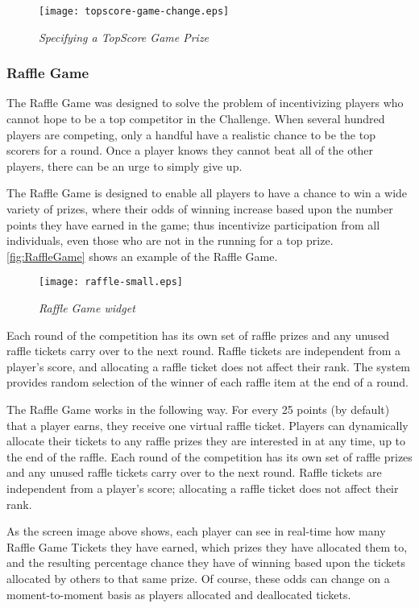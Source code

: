 \begin{figure}[!ht]
  \center
  \texttt{[image: topscore-game-change.eps]}
  \caption{\em Specifying a TopScore Game Prize}
  \label{fig:topscore-game-change}
\end{figure}

\clearpage

\subsubsection{Raffle Game}

The Raffle Game was designed to solve the problem of incentivizing players who cannot hope to be a top competitor in the Challenge. When several hundred players are competing, only a handful have a realistic chance to be the top scorers for a round. Once a player knows they cannot beat all of the other players, there can be an urge to simply give up.

The Raffle Game is designed to enable all players to have a chance to win a wide variety of prizes, where their odds of winning increase based upon the number points they have earned in the game; thus incentivize participation from all individuals, even those who are not in the running for a top prize. \autoref{fig:RaffleGame} shows an example of the Raffle Game.

\begin{figure}[!ht]
  \center
  \texttt{[image: raffle-small.eps]}
  \caption{\em Raffle Game widget}
  \label{fig:RaffleGame}
\end{figure}

Each round of the competition has its own set of raffle prizes and any unused raffle tickets carry over to the next round. Raffle tickets are independent from a player's score, and allocating a raffle ticket does not affect their rank. The system provides random selection of the winner of each raffle item at the end of a round.

The Raffle Game works in the following way. For every 25 points (by default) that a player earns, they receive one virtual raffle ticket. Players can dynamically allocate their tickets to any raffle prizes they are interested in at any time, up to the end of the raffle. Each round of the competition has its own set of raffle prizes and any unused raffle tickets carry over to the next round. Raffle tickets are independent from a player's score; allocating a raffle ticket does not affect their rank.

As the screen image above shows, each player can see in real-time how many Raffle Game Tickets they have earned, which prizes they have allocated them to, and the resulting percentage chance they have of winning based upon the tickets allocated by others to that same prize. Of course, these odds can change on a moment-to-moment basis as players allocated and deallocated tickets.

